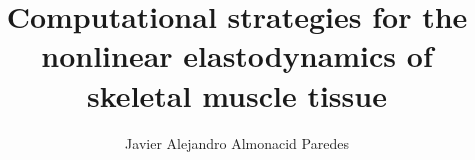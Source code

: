 \documentclass{sfuthesis}
\title{Computational strategies for the nonlinear elastodynamics of skeletal muscle tissue}
\author{Javier Alejandro Almonacid Paredes}
\numberwithin{equation}{chapter}
\numberwithin{figure}{chapter}
\numberwithin{table}{chapter}
\theoremstyle{definition}
\begin{document}
\frontmatter
\maketitle{}
\makecommittee{}


\begin{abstract}

\end{abstract}
\end{document}
